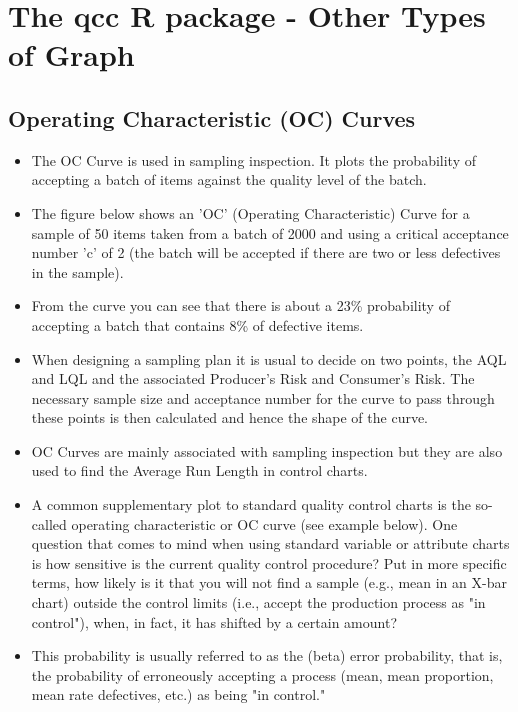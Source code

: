 \documentclass[MASTER-SPC.tex]{subfiles}
\begin{document}
\newpage

\section{The \textbf{qcc} R package - Other Types of Graph}




\subsection{Operating Characteristic (OC) Curves}
\begin{itemize}
\item 
The OC Curve is used in sampling inspection. It plots the probability of accepting a batch of items against the quality level of the batch.

\item The figure below shows an 'OC' (Operating Characteristic) Curve for a sample of 50 items taken from a batch of 2000 and using a critical acceptance number 'c' of 2 (the batch will be accepted if there are two or less defectives in the sample).

\item From the curve you can see that there is about a 23\% probability of accepting a batch that contains 8\% of defective items.

\item When designing a sampling plan it is usual to decide on two points, the AQL and LQL and the associated Producer's Risk and Consumer's Risk. The necessary sample size and acceptance number for the curve to pass through these points is then calculated and hence the shape of the curve.

\item OC Curves are mainly associated with sampling inspection but they are also used to find the Average Run Length in control charts.


\item A common supplementary plot to standard quality control charts is the so-called operating characteristic or OC curve (see example below). One question that comes to mind when using standard variable or attribute charts is how sensitive is the current quality control procedure? Put in more specific terms, how likely is it that you will not find a sample (e.g., mean in an X-bar chart) outside the control limits (i.e., accept the production process as "in control"), when, in fact, it has shifted by a certain amount? 

\item This probability is usually referred to as the  (beta) error probability, that is, the probability of erroneously accepting a process (mean, mean proportion, mean rate defectives, etc.) as being "in control." 


\end{itemize}
\end{document}
